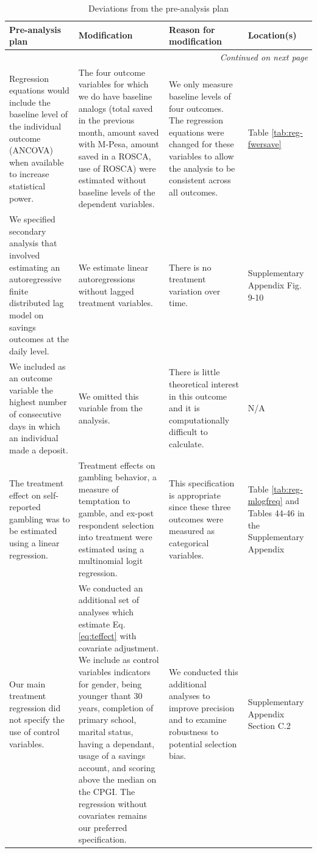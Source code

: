 \documentclass[12pt, titlepage]{article}
\begin{document}
	\begin{landscape}
	
		\begin{longtable}{p{}p{}p{}p{}}
			\caption{Deviations from the pre-analysis plan} \label{tab:deviations} \\
			\toprule
			Pre-analysis plan & Modification & Reason for modification & Location(s) \\
			\midrule
			\endhead
			\hline \multicolumn{4}{r}{\textit{Continued on next page}} \\
			\endfoot
			\bottomrule
			\endlastfoot
			Regression equations would include the baseline level of the individual outcome (ANCOVA) when available to increase statistical power. & The four outcome variables for which we do have baseline analogs (total saved in the previous month, amount saved with M-Pesa, amount saved in a ROSCA, use of ROSCA) were estimated without baseline levels of the dependent variables. & We only measure baseline levels of four outcomes. The regression equations were changed for these variables to allow the analysis to be consistent across all outcomes. & Table \ref{tab:reg-fwersave} \\
			\midrule
			We specified secondary analysis that involved estimating an autoregressive finite distributed lag model on savings outcomes at the daily level. & We estimate linear autoregressions without lagged treatment variables. & There is no treatment variation over time. & Supplementary Appendix Fig. 9-10 \\
			\midrule
			We included as an outcome variable the highest number of consecutive days in which an individual made a deposit. & We omitted this variable from the analysis. & There is little theoretical interest in this outcome and it is computationally difficult to calculate. & N/A \\
			\midrule
			The treatment effect on self-reported gambling was to be estimated using a linear regression. & Treatment effects on gambling behavior, a measure of temptation to gamble, and ex-post respondent selection into treatment were estimated using a multinomial logit regression. & This specification is appropriate since these three outcomes were measured as categorical variables. & Table \ref{tab:reg-mlogfreq} and Tables 44-46 in the Supplementary Appendix \\
			\midrule
			Our main treatment regression did not specify the use of control variables. & We conducted an additional set of analyses which estimate Eq. \ref{eq:teffect} with covariate adjustment. We include as control variables indicators for gender, being younger thant 30 years, completion of primary school, marital status, having a dependant, usage of a savings account, and scoring above the median on the CPGI. The regression without covariates remains our preferred specification. & We conducted this additional analyses to improve precision and to examine robustness to potential selection bias. & Supplementary Appendix Section C.2 \\

\end{longtable}
\end{landscape}
\end{document}
